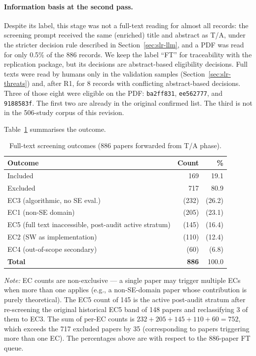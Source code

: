 \paragraph{Information basis at the second pass.} Despite its label, this
stage was not a full-text reading for almost all records: the screening
prompt received the same (enriched) title and abstract as T/A, under the
stricter decision rule described in Section~\ref{sec:slr-llm}, and a PDF was
read for only 0.5\% of the 886 records. We keep the label ``FT'' for
traceability with the replication package, but its decisions are
abstract-based eligibility decisions. Full texts were read by humans only in
the validation samples (Section~\ref{sec:slr-threats}) and, after R1, for 8
records with conflicting abstract-based decisions. Three of those eight were
eligible on the PDF: \texttt{ba2ff831}, \texttt{ee562777}, and
\texttt{9188583f}. The first two are already in the original confirmed list.
The third is not in the 506-study corpus of this revision.

Table~\ref{tab:ft-screening} summarises the outcome.

\begin{table}[htbp]
\centering
\caption{Full-text screening outcomes (886 papers forwarded from T/A phase).}
\label{tab:ft-screening}
\small
\setlength{\tabcolsep}{4pt}
\begin{tabular}{lrr}
\toprule
\textbf{Outcome} & \textbf{Count} & \textbf{\%} \\
\midrule
Included                             & 169 & 19.1 \\
Excluded                             & 717 & 80.9 \\
\quad EC3 (algorithmic, no SE eval.) & (232) & (26.2) \\
\quad EC1 (non-SE domain)            & (205) & (23.1) \\
\quad EC5 (full text inaccessible, post-audit active stratum)   & (145) & (16.4) \\
\quad EC2 (SW as implementation)     & (110) & (12.4) \\
\quad EC4 (out-of-scope secondary)   & (60)  & (6.8)  \\
\midrule
\textbf{Total} & \textbf{886} & 100.0 \\
\bottomrule
\end{tabular}

\smallskip
\footnotesize\textit{Note:} EC counts are non-exclusive --- a single paper may
trigger multiple ECs when more than one applies (e.g., a non-SE-domain paper
whose contribution is purely theoretical). The EC5 count of 145 is the active
post-audit stratum after re-screening the original historical EC5 band of 148
papers and reclassifying 3 of them to EC3. The sum of per-EC counts is
$232+205+145+110+60 = 752$, which exceeds the 717 excluded papers by 35
(corresponding to papers triggering more than one EC). The percentages above
are with respect to the 886-paper FT queue.
\end{table}

